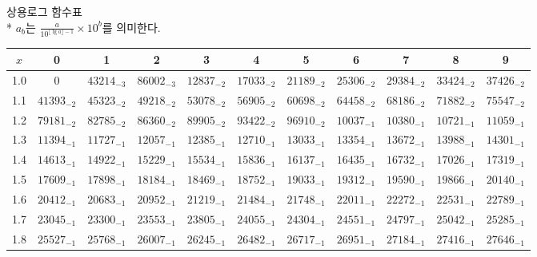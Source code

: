 \documentclass[10pt, a4paper]{article}
\begin{document}
\pagebreak
\begin{center}
    \huge{상용로그 함수표}\normalsize\\

    * \(a_b\)는 \(\displaystyle{\frac{a}{\displaystyle{10^{\lfloor \lg{a} \rfloor - 1}}} \times 10^{b}}\)를 의미한다. 
    \begin{longtable}{c || c c c c c | c c c c c}
        \(x\) & 0 & 1 & 2 & 3 & 4 & 5 & 6 & 7 & 8 & 9\\
        \hline\hline
        1.0 & \({0}\) & \({43214}_{-3}\) & \({86002}_{-3}\) & \({12837}_{-2}\) & \({17033}_{-2}\) & \({21189}_{-2}\) & \({25306}_{-2}\) & \({29384}_{-2}\) & \({33424}_{-2}\) & \({37426}_{-2}\)\\
        1.1 & \({41393}_{-2}\) & \({45323}_{-2}\) & \({49218}_{-2}\) & \({53078}_{-2}\) & \({56905}_{-2}\) & \({60698}_{-2}\) & \({64458}_{-2}\) & \({68186}_{-2}\) & \({71882}_{-2}\) & \({75547}_{-2}\)\\
        1.2 & \({79181}_{-2}\) & \({82785}_{-2}\) & \({86360}_{-2}\) & \({89905}_{-2}\) & \({93422}_{-2}\) & \({96910}_{-2}\) & \({10037}_{-1}\) & \({10380}_{-1}\) & \({10721}_{-1}\) & \({11059}_{-1}\)\\
        1.3 & \({11394}_{-1}\) & \({11727}_{-1}\) & \({12057}_{-1}\) & \({12385}_{-1}\) & \({12710}_{-1}\) & \({13033}_{-1}\) & \({13354}_{-1}\) & \({13672}_{-1}\) & \({13988}_{-1}\) & \({14301}_{-1}\)\\
        1.4 & \({14613}_{-1}\) & \({14922}_{-1}\) & \({15229}_{-1}\) & \({15534}_{-1}\) & \({15836}_{-1}\) & \({16137}_{-1}\) & \({16435}_{-1}\) & \({16732}_{-1}\) & \({17026}_{-1}\) & \({17319}_{-1}\)\\
        1.5 & \({17609}_{-1}\) & \({17898}_{-1}\) & \({18184}_{-1}\) & \({18469}_{-1}\) & \({18752}_{-1}\) & \({19033}_{-1}\) & \({19312}_{-1}\) & \({19590}_{-1}\) & \({19866}_{-1}\) & \({20140}_{-1}\)\\
        1.6 & \({20412}_{-1}\) & \({20683}_{-1}\) & \({20952}_{-1}\) & \({21219}_{-1}\) & \({21484}_{-1}\) & \({21748}_{-1}\) & \({22011}_{-1}\) & \({22272}_{-1}\) & \({22531}_{-1}\) & \({22789}_{-1}\)\\
        1.7 & \({23045}_{-1}\) & \({23300}_{-1}\) & \({23553}_{-1}\) & \({23805}_{-1}\) & \({24055}_{-1}\) & \({24304}_{-1}\) & \({24551}_{-1}\) & \({24797}_{-1}\) & \({25042}_{-1}\) & \({25285}_{-1}\)\\
        1.8 & \({25527}_{-1}\) & \({25768}_{-1}\) & \({26007}_{-1}\) & \({26245}_{-1}\) & \({26482}_{-1}\) & \({26717}_{-1}\) & \({26951}_{-1}\) & \({27184}_{-1}\) & \({27416}_{-1}\) & \({27646}_{-1}\)\\

\end{longtable}
\end{center}
\end{document}
